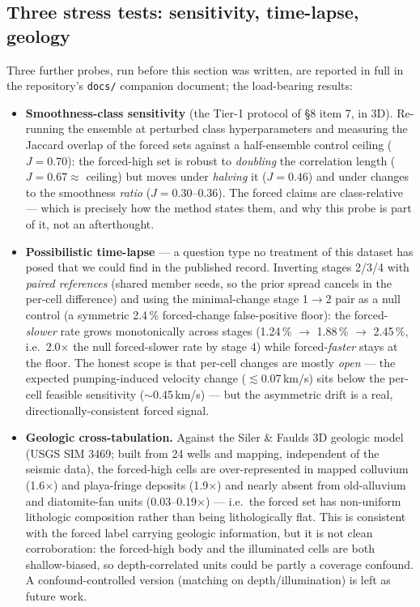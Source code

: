 \documentclass[11pt]{article}
\newcommand{\file}[1]{\texttt{#1}}
\begin{document}
\subsection{Three stress tests: sensitivity, time-lapse, geology}

Three further probes, run before this section was written, are reported
in full in the repository's \file{docs/} companion document; the
load-bearing results:

\begin{itemize}
\item \textbf{Smoothness-class sensitivity} (the Tier-1 protocol of \S8
  item 7, in 3D). Re-running the ensemble at perturbed class
  hyperparameters and measuring the Jaccard overlap of the forced sets
  against a half-ensemble control ceiling ($J = 0.70$): the forced-high
  set is robust to \emph{doubling} the correlation length
  ($J = 0.67 \approx$ ceiling) but moves under \emph{halving} it
  ($J = 0.46$) and under changes to the smoothness \emph{ratio}
  ($J = 0.30$--$0.36$). The forced claims are class-relative --- which is
  precisely how the method states them, and why this probe is part of it,
  not an afterthought.
\item \textbf{Possibilistic time-lapse} --- a question type no treatment
  of this dataset has posed that we could find in the published record.
  Inverting stages 2/3/4 with \emph{paired references} (shared member
  seeds, so the prior spread cancels in the per-cell difference) and using
  the minimal-change stage 1$\rightarrow$2 pair as a null control (a
  symmetric 2.4\,\% forced-change false-positive floor): the
  forced-\emph{slower} rate grows monotonically across stages
  (1.24\,\% $\rightarrow$ 1.88\,\% $\rightarrow$ 2.45\,\%, i.e.\
  2.0$\times$ the null forced-slower rate by stage 4) while
  forced-\emph{faster} stays at the floor. The honest scope is that
  per-cell changes are mostly \emph{open} --- the expected pumping-induced
  velocity change ($\lesssim$0.07\,km/s) sits below the per-cell feasible
  sensitivity ($\sim$0.45\,km/s) --- but the asymmetric drift is a real,
  directionally-consistent forced signal.
\item \textbf{Geologic cross-tabulation.} Against the Siler \& Faulds 3D
  geologic model (USGS SIM 3469; built from 24 wells and mapping,
  independent of the seismic data), the forced-high cells are
  over-represented in mapped colluvium (1.6$\times$) and playa-fringe
  deposits (1.9$\times$) and nearly absent from old-alluvium and
  diatomite-fan units (0.03--0.19$\times$) --- i.e.\ the forced set has
  non-uniform lithologic composition rather than being lithologically
  flat. This is consistent with the forced label carrying geologic
  information, but it is not clean corroboration: the forced-high body and
  the illuminated cells are both shallow-biased, so depth-correlated units
  could be partly a coverage confound. A confound-controlled version
  (matching on depth/illumination) is left as future work.
\end{itemize}
\end{document}
